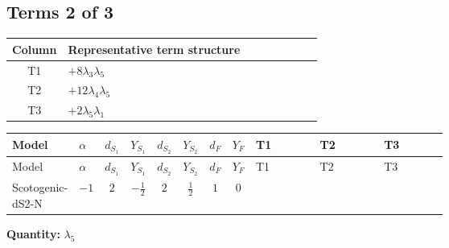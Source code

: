 \documentclass[8pt]{article}
\begin{document}
\begin{landscape}
\subsection*{Terms 2 of 3}
\begin{center}
\begin{tabular}{@{}c >{\raggedright\arraybackslash}p{0.82\linewidth}@{}}
\toprule
Column & Representative term structure \\
\midrule
T1 & \(\displaystyle +8 {\lambda_3} {\lambda_5}\) \\
\midrule
T2 & \(\displaystyle +12 {\lambda_4} {\lambda_5}\) \\
\midrule
T3 & \(\displaystyle +2 {\lambda_5} {\lambda_1}\) \\
\midrule
\bottomrule
\end{tabular}
\end{center}
\smallskip
\tiny
\begin{longtable}{@{}llcccccc >{\raggedright\arraybackslash}p{0.21\linewidth} >{\raggedright\arraybackslash}p{0.21\linewidth} >{\raggedright\arraybackslash}p{0.21\linewidth}@{}}
\toprule
Model & $\alpha$ & $d_{S_1}$ & $Y_{S_1}$ & $d_{S_2}$ & $Y_{S_2}$ & $d_F$ & $Y_F$ & T1 & T2 & T3 \\
\midrule
\endfirsthead
\toprule
Model & $\alpha$ & $d_{S_1}$ & $Y_{S_1}$ & $d_{S_2}$ & $Y_{S_2}$ & $d_F$ & $Y_F$ & T1 & T2 & T3 \\
\midrule
\endhead
Scotogenic-dS2-N & $-1$ & $2$ & $-\frac{1}{2}$ & $2$ & $\frac{1}{2}$ & $1$ & $0$ & \scriptsize\adjustbox{max width=\linewidth}{$\begin{gathered} +8 {\lambda_3} {\lambda_5}\end{gathered}$} & \scriptsize\adjustbox{max width=\linewidth}{$\begin{gathered} +12 {\lambda_4} {\lambda_5}\end{gathered}$} & \scriptsize\adjustbox{max width=\linewidth}{$\begin{gathered} +2 {\lambda_5} {\lambda_1}\end{gathered}$} \\
\midrule
\bottomrule
\end{longtable}
\clearpage
\noindent\textbf{Quantity: }$\lambda_5$\par\smallskip

\end{landscape}
\end{document}
